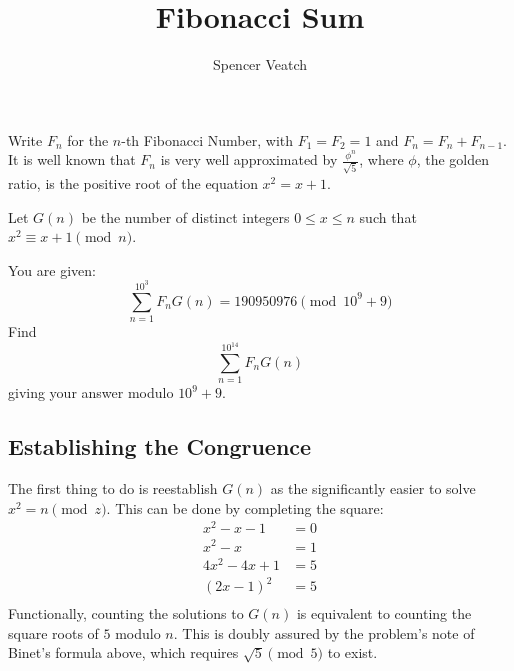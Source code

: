 \documentclass{article}
\title{Fibonacci Sum}
\author{Spencer Veatch}
\theoremstyle{mytheoremstyle}
\theoremstyle{mytheoremstyle}
\theoremstyle{myproblemstyle}
\begin{document}
    \maketitle
    \begin{problem}
        Write \( F_n \) for the \( n \)-th Fibonacci Number, with \( F_1 = F_2 = 1\) and \( F_n = F_{n} + F_{n -1} \).
        It is well known that \( F_{n} \) is very well approximated by \( \frac{\phi^n}{\sqrt{5} } \), where \( \phi
        \), the golden ratio, is the positive root of the equation \( x^2 = x + 1 \).
        \newline

        \noindent Let \( G(n) \) be the number of distinct integers \( 0 \le  x \le n \) such that \( x^2 \equiv x + 1 \pmod n\). 

        \noindent You are given: \[
            \displaystyle\sum_{n = 1}^{10^3} F_n G(n) = 190950976 \pmod{10^9 + 9}
        \] 
        Find \[
            \displaystyle\sum_{n = 1}^{10^{14}} F_n G(n)
        \]
        giving your answer modulo \( 10^9 + 9 \).
    \end{problem}
    \subsection{Establishing the Congruence}\label{sub:Establishing the Congruence} %
    The first thing to do is reestablish \( G(n) \) as the significantly easier to solve \( x^2 = n \pmod z \). This can
    be done by completing the square: \[
        \begin{align}
            x^2 - x - 1 &= 0 \\
            x^2 - x &= 1 \\
            4x^2 -4x + 1 &= 5 \\
            (2x- 1)^2 &= 5 \\
        \end{align}
    \] 
    Functionally, counting the solutions to \( G(n) \) is equivalent to counting the square roots of \( 5 \) modulo \( n
    \). This is doubly assured by the problem's note of Binet's formula above, which requires \( \sqrt{5} \pmod 5  \) to
    exist.
    
\end{document}
